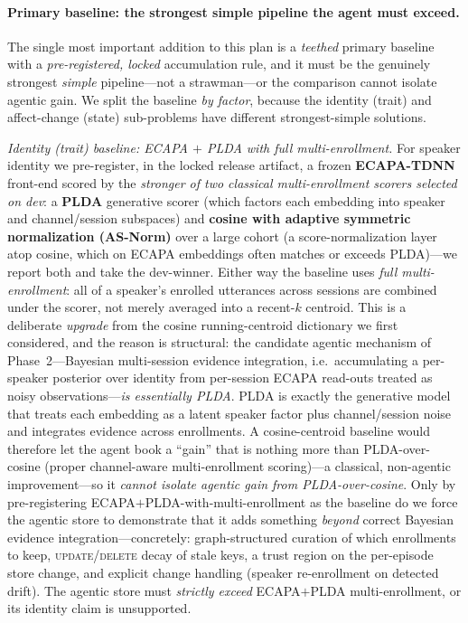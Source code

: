 \paragraph{Primary baseline: the strongest simple pipeline the agent must exceed.} The single most important addition to this plan is a \emph{teethed} primary baseline with a \emph{pre-registered, locked} accumulation rule, and it must be the genuinely strongest \emph{simple} pipeline---not a strawman---or the comparison cannot isolate agentic gain. We split the baseline \emph{by factor}, because the identity (trait) and affect-change (state) sub-problems have different strongest-simple solutions.

\emph{Identity (trait) baseline: ECAPA $+$ PLDA with full multi-enrollment.} For speaker identity we pre-register, in the locked release artifact, a frozen \textbf{ECAPA-TDNN} front-end \citep{ecapatdnn2020,xvector2021} scored by the \emph{stronger of two classical multi-enrollment scorers selected on dev}: a \textbf{PLDA} generative scorer (which factors each embedding into speaker and channel/session subspaces) and \textbf{cosine with adaptive symmetric normalization (AS-Norm)} over a large cohort (a score-normalization layer atop cosine, which on ECAPA embeddings often matches or exceeds PLDA)---we report both and take the dev-winner. Either way the baseline uses \emph{full multi-enrollment}: all of a speaker's enrolled utterances across sessions are combined under the scorer, not merely averaged into a recent-$k$ centroid. This is a deliberate \emph{upgrade} from the cosine running-centroid dictionary we first considered, and the reason is structural: the candidate agentic mechanism of Phase~2---Bayesian multi-session evidence integration, i.e.\ accumulating a per-speaker posterior over identity from per-session ECAPA read-outs treated as noisy observations---\emph{is essentially PLDA}. PLDA is exactly the generative model that treats each embedding as a latent speaker factor plus channel/session noise and integrates evidence across enrollments. A cosine-centroid baseline would therefore let the agent book a ``gain'' that is nothing more than PLDA-over-cosine (proper channel-aware multi-enrollment scoring)---a classical, non-agentic improvement---so it \emph{cannot isolate agentic gain from PLDA-over-cosine}. Only by pre-registering ECAPA$+$PLDA-with-multi-enrollment as the baseline do we force the agentic store to demonstrate that it adds something \emph{beyond} correct Bayesian evidence integration---concretely: graph-structured curation of which enrollments to keep, \textsc{update}/\textsc{delete} decay of stale keys, a trust region on the per-episode store change, and explicit change handling (speaker re-enrollment on detected drift). The agentic store must \emph{strictly exceed} ECAPA$+$PLDA multi-enrollment, or its identity claim is unsupported.

